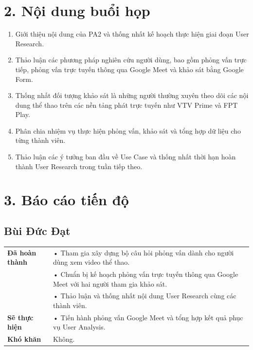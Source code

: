 \documentclass[11pt,a4paper]{article}
\begin{document}
\vspace{0.8cm}


\section*{2. Nội dung buổi họp}

\begin{enumerate}
    \item Giới thiệu nội dung của PA2 và thống nhất kế hoạch thực hiện giai đoạn User Research.

    \item Thảo luận các phương pháp nghiên cứu người dùng, bao gồm phỏng vấn trực tiếp, phỏng vấn trực tuyến thông qua Google Meet và khảo sát bằng Google Form.

    \item Thống nhất đối tượng khảo sát là những người thường xuyên theo dõi các nội dung thể thao trên các nền tảng phát trực tuyến như VTV Prime và FPT Play.

    \item Phân chia nhiệm vụ thực hiện phỏng vấn, khảo sát và tổng hợp dữ liệu cho từng thành viên.

    \item Thảo luận các ý tưởng ban đầu về Use Case và thống nhất thời hạn hoàn thành User Research trong tuần tiếp theo.
\end{enumerate}


\section*{3. Báo cáo tiến độ}


\subsection*{Bùi Đức Đạt}

\begin{tabularx}{\textwidth}{|p{4cm}|X|}
\hline
\textbf{Đã hoàn thành} &
• Tham gia xây dựng bộ câu hỏi phỏng vấn dành cho người dùng xem video thể thao.\\
&
• Chuẩn bị kế hoạch phỏng vấn trực tuyến thông qua Google Meet với hai người tham gia khảo sát.\\
&
• Thảo luận và thống nhất nội dung User Research cùng các thành viên.\\
\hline

\textbf{Sẽ thực hiện} &
• Tiến hành phỏng vấn Google Meet và tổng hợp kết quả phục vụ User Analysis.\\
\hline

\textbf{Khó khăn} &
Không.\\
\hline
\end{tabularx}
\end{document}
